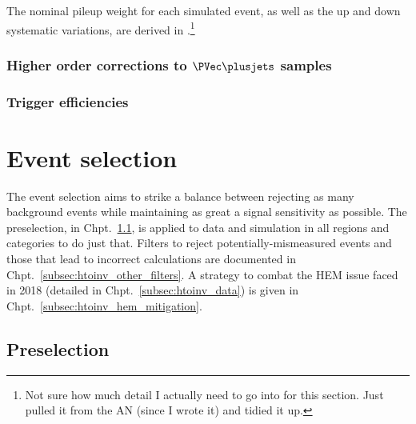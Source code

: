 The nominal \gls{pileup} weight for each simulated event, as well as the up and down systematic variations, are derived in \nanoAODtools.\footnote{Not sure how much detail I actually need to go into for this section. Just pulled it from the AN (since I wrote it) and tidied it up.} %




\subsubsection{Higher order corrections to \texorpdfstring{$\PVec \plusjets$}{V plus jets} samples}
\label{subsubsec:htoinv_nlo_corrs}




\subsubsection{Trigger efficiencies}
\label{subsubsec:htoinv_trigger_effs}




\section{Event selection}
\label{sec:htoinv_event_selection}

The event selection aims to strike a balance between rejecting as many background events while maintaining as great a signal sensitivity as possible. The preselection, in Chpt.~\ref{subsec:htoinv_preselection}, is applied to data and simulation in all regions and categories to do just that. Filters to reject potentially-mismeasured events and those that lead to incorrect \ptmiss calculations are documented in Chpt.~\ref{subsec:htoinv_other_filters}. A strategy to combat the HEM issue faced in 2018 (detailed in Chpt.~\ref{subsec:htoinv_data}) is given in Chpt.~\ref{subsec:htoinv_hem_mitigation}.





\subsection{Preselection}
\label{subsec:htoinv_preselection}

